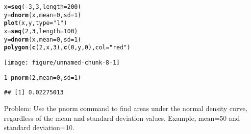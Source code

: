\documentclass{article}\usepackage[]{graphicx}\usepackage[]{xcolor}
\makeatletter
\def\maxwidth{ %
  \ifdim\Gin@nat@width>\linewidth
    \linewidth
  \else
    \Gin@nat@width
  \fi
}
\newcommand{\hlnum}[1]{\textcolor[rgb]{0.686,0.059,0.569}{#1}}%
\newcommand{\hlsng}[1]{\textcolor[rgb]{0.192,0.494,0.8}{#1}}%
\newcommand{\hlopt}[1]{\textcolor[rgb]{0,0,0}{#1}}%
\newcommand{\hldef}[1]{\textcolor[rgb]{0.345,0.345,0.345}{#1}}%
\newcommand{\hlkwb}[1]{\textcolor[rgb]{0.69,0.353,0.396}{#1}}%
\newcommand{\hlkwc}[1]{\textcolor[rgb]{0.333,0.667,0.333}{#1}}%
\newcommand{\hlkwd}[1]{\textcolor[rgb]{0.737,0.353,0.396}{\textbf{#1}}}%
\newenvironment{kframe}{%
 \def\at@end@of@kframe{}%
 \ifinner\ifhmode%
  \def\at@end@of@kframe{\end{minipage}}%
  \begin{minipage}{\columnwidth}%
 \fi\fi%
 \def\FrameCommand##1{\hskip\@totalleftmargin \hskip-\fboxsep
 \colorbox{shadecolor}{##1}\hskip-\fboxsep
     \hskip-\linewidth \hskip-\@totalleftmargin \hskip\columnwidth}%
 \MakeFramed {\advance\hsize-\width
   \@totalleftmargin\z@ \linewidth\hsize
   \@setminipage}}%
 {\par\unskip\endMakeFramed%
 \at@end@of@kframe}
\newenvironment{knitrout}{}{} %
\makeatother
\begin{document}
\begin{knitrout}
\color{fgcolor}\begin{kframe}
\begin{alltt}
\hldef{x}\hlkwb{=}\hlkwd{seq}\hldef{(}\hlopt{-}\hlnum{3}\hldef{,}\hlnum{3}\hldef{,}\hlkwc{length}\hldef{=}\hlnum{200}\hldef{)}
\hldef{y}\hlkwb{=}\hlkwd{dnorm}\hldef{(x,}\hlkwc{mean}\hldef{=}\hlnum{0}\hldef{,}\hlkwc{sd}\hldef{=}\hlnum{1}\hldef{)}
\hlkwd{plot}\hldef{(x,y,}\hlkwc{type}\hldef{=}\hlsng{"l"}\hldef{)}
\hldef{x}\hlkwb{=}\hlkwd{seq}\hldef{(}\hlnum{2}\hldef{,}\hlnum{3}\hldef{,}\hlkwc{length}\hldef{=}\hlnum{100}\hldef{)}
\hldef{y}\hlkwb{=}\hlkwd{dnorm}\hldef{(x,}\hlkwc{mean}\hldef{=}\hlnum{0}\hldef{,}\hlkwc{sd}\hldef{=}\hlnum{1}\hldef{)}
\hlkwd{polygon}\hldef{(}\hlkwd{c}\hldef{(}\hlnum{2}\hldef{,x,}\hlnum{3}\hldef{),}\hlkwd{c}\hldef{(}\hlnum{0}\hldef{,y,}\hlnum{0}\hldef{),}\hlkwc{col}\hldef{=}\hlsng{"red"}\hldef{)}
\end{alltt}
\end{kframe}
\texttt{[image: figure/unnamed-chunk-8-1]} 
\begin{kframe}\begin{alltt}
\hlnum{1}\hlopt{-}\hlkwd{pnorm}\hldef{(}\hlnum{2}\hldef{,}\hlkwc{mean}\hldef{=}\hlnum{0}\hldef{,}\hlkwc{sd}\hldef{=}\hlnum{1}\hldef{)}
\end{alltt}
\begin{verbatim}
## [1] 0.02275013
\end{verbatim}
\end{kframe}
\end{knitrout}
Problem: \newline 
Use the pnorm command to find areas under the normal density curve, regardless of the mean and standard deviation values. Example, mean=50 and standard deviation=10.
\end{document}
